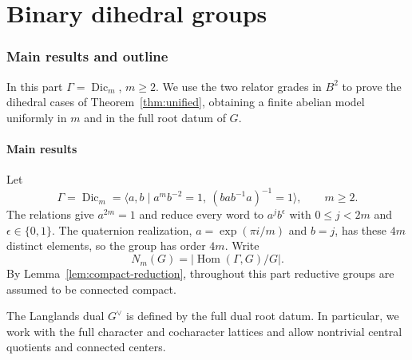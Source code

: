 \documentclass[11pt,a4paper,reqno]{amsart}
\theoremstyle{plain}
\theoremstyle{definition}
\theoremstyle{remark}
\numberwithin{equation}{section}
\DeclareMathOperator{\Hom}{Hom}
\newcommand{\Dic}{\operatorname{Dic}}
\begin{document}
\clearpage
\part{Binary dihedral groups}\label{part:dihedral}

\section{Main results and outline}

In this part $\Gamma=\Dic_m$, $m\ge2$. We use the two relator grades in $B^2$ to prove the dihedral cases of Theorem~\ref{thm:unified}, obtaining a finite abelian model uniformly in $m$ and in the full root datum of $G$.

\subsection{Main results}

Let
\begin{equation}\label{eq:presentation}
\Gamma=\Dic_m=\langle a,b\mid a^m b^{-2}=1,\ (bab^{-1}a)^{-1}=1\rangle, \qquad m\ge2.
\end{equation}
The relations give $a^{2m}=1$ and reduce every word to $a^j b^\epsilon$ with $0\le j<2m$ and $\epsilon\in\{0,1\}$. The quaternion realization, $a=\exp(\pi i/m)$ and $b=j$, has these $4m$ distinct elements, so the group has order $4m$. Write
\[
N_m(G)=|\Hom(\Gamma,G)/G|.
\]
By Lemma~\ref{lem:compact-reduction}, throughout this part reductive groups are assumed to be connected compact.

The Langlands dual $G^\vee$ is defined by the full dual root datum. In particular, we work with the full character and cocharacter lattices and allow nontrivial central quotients and connected centers.
\end{document}
